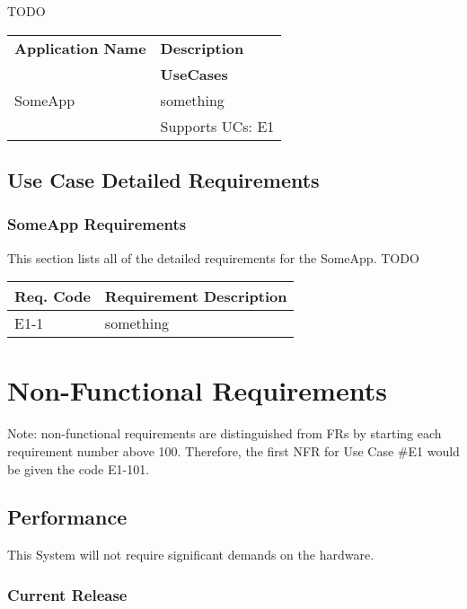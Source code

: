 \documentclass[12pt]{article}
\begin{document}
TODO

\begin{table}[!h]
	\begin{tabular}{| l | l |}
		\hline
		\textbf{Application Name} & \textbf{Description}\\ \cline{2-1}
															& \textbf{UseCases}\\
		\hline
		SomeApp	& something\\ \cline{2-1}
						& Supports UCs: E1\\
		\hline
	\end{tabular}
	\label{tab:Applications}
\end{table}

\subsection{Use Case Detailed Requirements}

\subsubsection{SomeApp Requirements}
This section lists all of the detailed requirements for the SomeApp.
TODO

\begin{table}[!h]
	\begin{tabular}{| l | l |}
	 	\hline
		\textbf{Req. Code} & \textbf{Requirement Description}\\
		\hline
		E1-1	& something\\
		\hline
	\end{tabular}
	\label{tab:SomeAppRequirements}
\end{table}


\section{Non-Functional Requirements}
Note: non-functional requirements are distinguished from FRs by starting each requirement number above 100. Therefore, the first 
NFR for Use Case \#E1 would be given the code E1-101.

\subsection{Performance}
This System will not require significant demands on the hardware.

\subsubsection{Current Release}
\end{document}

